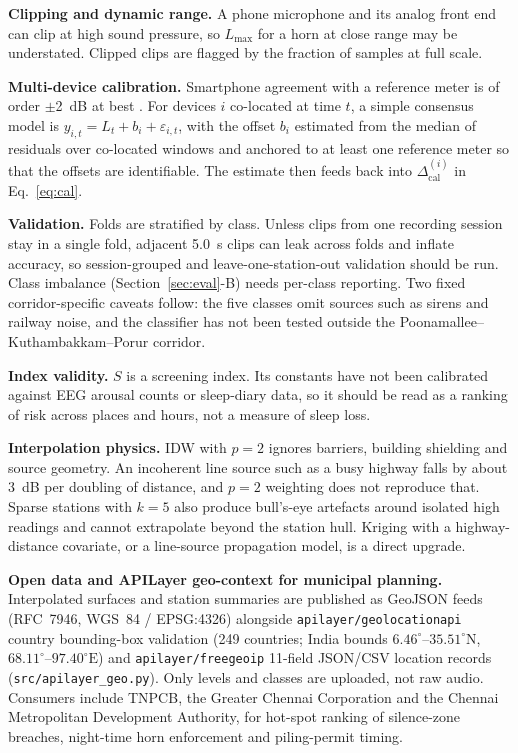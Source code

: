 \documentclass[conference]{IEEEtran}
\newcommand{\Lmax}{L_{\max}}
\begin{document}
\textbf{Clipping and dynamic range.} A phone microphone and its analog front end can clip at high sound pressure, so $\Lmax$ for a horn at close range may be understated. Clipped clips are flagged by the fraction of samples at full scale.

\textbf{Multi-device calibration.} Smartphone agreement with a reference meter is of order $\pm$2~dB at best \cite{kardous}. For devices $i$ co-located at time $t$, a simple consensus model is $y_{i,t}=L_t+b_i+\varepsilon_{i,t}$, with the offset $b_i$ estimated from the median of residuals over co-located windows and anchored to at least one reference meter so that the offsets are identifiable. The estimate then feeds back into $\Delta_{\text{cal}}^{(i)}$ in Eq.~\eqref{eq:cal}.

\textbf{Validation.} Folds are stratified by class. Unless clips from one recording session stay in a single fold, adjacent 5.0~s clips can leak across folds and inflate accuracy, so session-grouped and leave-one-station-out validation should be run. Class imbalance (Section~\ref{sec:eval}-B) needs per-class reporting. Two fixed corridor-specific caveats follow: the five classes omit sources such as sirens and railway noise, and the classifier has not been tested outside the Poonamallee--Kuthambakkam--Porur corridor.

\textbf{Index validity.} $S$ is a screening index. Its constants have not been calibrated against EEG arousal counts or sleep-diary data, so it should be read as a ranking of risk across places and hours, not a measure of sleep loss.

\textbf{Interpolation physics.} IDW with $p=2$ ignores barriers, building shielding and source geometry. An incoherent line source such as a busy highway falls by about 3~dB per doubling of distance, and $p=2$ weighting does not reproduce that. Sparse stations with $k=5$ also produce bull's-eye artefacts around isolated high readings and cannot extrapolate beyond the station hull. Kriging with a highway-distance covariate, or a line-source propagation model, is a direct upgrade.

\textbf{Open data and APILayer geo-context for municipal planning.} Interpolated surfaces and station summaries are published as GeoJSON feeds (RFC~7946, WGS~84 / EPSG:4326) alongside \texttt{apilayer/geolocationapi} country bounding-box validation (249 countries; India bounds $6.46^\circ\text{--}35.51^\circ\text{N}$, $68.11^\circ\text{--}97.40^\circ\text{E}$) and \texttt{apilayer/freegeoip} 11-field JSON/CSV location records (\texttt{src/apilayer\_geo.py}). Only levels and classes are uploaded, not raw audio. Consumers include TNPCB, the Greater Chennai Corporation and the Chennai Metropolitan Development Authority, for hot-spot ranking of silence-zone breaches, night-time horn enforcement and piling-permit timing.
\end{document}
